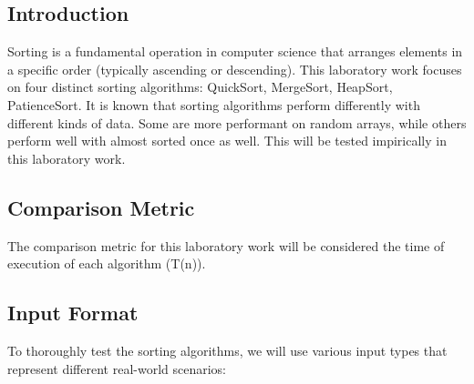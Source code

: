 \documentclass[a4paper,12pt]{article}
\begin{document}
\subsection{Introduction}
\label{sec:org801d4f8}
Sorting is a fundamental operation in computer science that arranges elements in a specific order (typically ascending or descending). This laboratory work focuses on four distinct sorting algorithms: QuickSort, MergeSort, HeapSort, PatienceSort.
It is known that sorting algorithms perform differently with different kinds of data. Some are more performant on random arrays, while others perform well with almost sorted once as well. This will be tested impirically in this laboratory work.
\subsection{Comparison Metric}
\label{sec:org584f8f1}
The comparison metric for this laboratory work will be considered the time of execution of each algorithm (T(n)).
\subsection{Input Format}
\label{sec:org6d7fb3a}
To thoroughly test the sorting algorithms, we will use various input types that represent different real-world scenarios:
\end{document}
